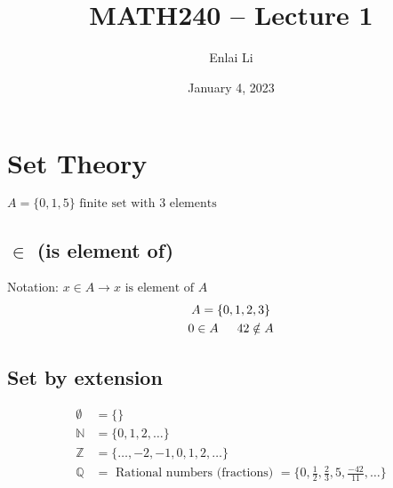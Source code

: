 \documentclass{article}
\author{Enlai Li}
\title{MATH240 -- Lecture 1}
\date{January 4, 2023}
\begin{document}
\maketitle
\section{Set Theory}
$A = \{0, 1, 5\} \text{ finite set with 3 elements}$

\subsection{$\in$ (is element of)}
Notation: $x \in A \rightarrow x \text{ is element of } A$
\begin{gather*}
    A = \{0,1,2,3\} \\
    0 \in A \text{\indent } 42 \notin A
\end{gather*}

\subsection{Set by extension}
\begin{align*}
    \emptyset  & = \{\}                                                                  \\
    \mathbb{N} & = \{0,1,2,\ldots\}                                                      \\
    \mathbb{Z} & = \{\ldots,-2,-1,0,1,2,\ldots\}                                         \\
    \mathbb{Q} & = \text{ Rational numbers (fractions) } = \{0, \frac{1}{2}, \frac{2}{3}
    , 5, \frac{-42}{11}, \ldots\}
\end{align*}
\end{document}
